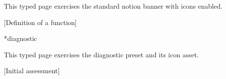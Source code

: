 \documentclass[11pt,a4paper]{article}
\begin{document}
This typed page exercises the standard notion banner with icons enabled.

[Definition of a function]

\begin{indexTypeTable}*{diagnostic}
\end{indexTypeTable}

This typed page exercises the diagnostic preset and its icon asset.

[Initial assessment]
\end{document}
